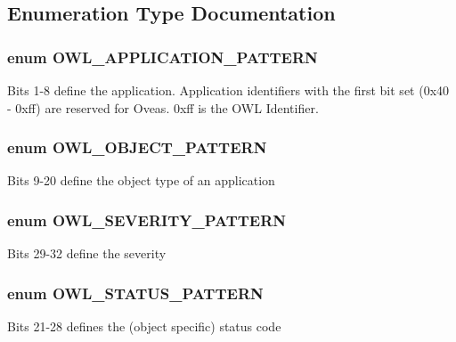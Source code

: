 \subsection{Enumeration Type Documentation}
\hypertarget{class_8register_8php_22359c406b8745e8fa2412ec96d5e74c}{
\subsubsection{\setlength{\rightskip}{0pt plus 5cm}enum {\bf OWL\_\-APPLICATION\_\-PATTERN}}}
\label{class_8register_8php_22359c406b8745e8fa2412ec96d5e74c}


Bits 1-8 define the application. Application identifiers with the first bit set (0x40 - 0xff) are reserved for Oveas. 0xff is the OWL Identifier. \hypertarget{class_8register_8php_ac5ed52fb1bbffdff69e9a24c40962f5}{
\subsubsection{\setlength{\rightskip}{0pt plus 5cm}enum {\bf OWL\_\-OBJECT\_\-PATTERN}}}
\label{class_8register_8php_ac5ed52fb1bbffdff69e9a24c40962f5}


Bits 9-20 define the object type of an application \hypertarget{class_8register_8php_eb9363fcaa1cd911762ff88518a9d973}{
\subsubsection{\setlength{\rightskip}{0pt plus 5cm}enum {\bf OWL\_\-SEVERITY\_\-PATTERN}}}
\label{class_8register_8php_eb9363fcaa1cd911762ff88518a9d973}


Bits 29-32 define the severity \hypertarget{class_8register_8php_0a8649e9ad7fa654df2c41aa4ba1283c}{
\subsubsection{\setlength{\rightskip}{0pt plus 5cm}enum {\bf OWL\_\-STATUS\_\-PATTERN}}}
\label{class_8register_8php_0a8649e9ad7fa654df2c41aa4ba1283c}


Bits 21-28 defines the (object specific) status code 